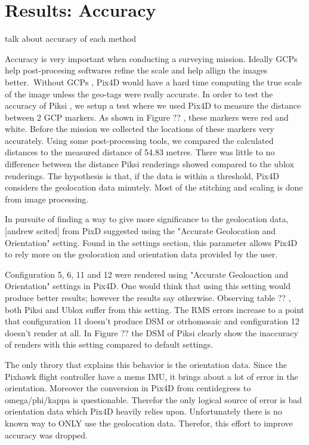 \documentclass{article}
\begin{document}
\section{Results: Accuracy}
talk about accuracy of each method

Accuracy is very important when conducting a surveying mission. Ideally GCPs help post-procesing softwares refine the scale and help allign the images better. Without GCPs , Pix4D would have a hard time computing the true scale of the image unless the geo-tags were really accurate. In order to test the accuracy of Piksi , we setup a test where we used Pix4D to measure the distance between 2 GCP markers. As shown in Figure ?? , these markers were red and white. Before the mission we collected the locations of these markers very accurately. Using some post-processing tools, we compared the calculated distances to the measured distance of 54.83 metres. There was little to no difference between the distance Piksi renderings showed compared to the ublox renderings. The hypothesis is that, if the data is within a threshold, Pix4D considers the geolocation data minutely. Most of the stitching and scaling is done from image processing.

In pursuite of finding a way to give more significance to the geolocation data, [andrew scited] from PixD suggested using the "Accurate Geolocation and Orientation" setting. Found in the settings section, this parameter allows Pix4D to rely more on the geolocation and orientation data provided by the user.

Configuration 5, 6, 11 and 12 were rendered using "Accurate Geoloaction and Orientation" settings in Pix4D. One would think that using this setting would produce better results; however the results say otherwise. Observing table ?? , both Piksi and Ublox suffer from this setting. The RMS errors increase to a point that configuration 11 doesn't produce DSM or otrhomosaic and configuration 12 doesn't render at all. In Figure ?? the DSM of Piksi clearly show the inaccuracy of renders with this setting compared to default settings.

The only throry that explains this behavior is the orientation data. Since the Pixhawk flight controller have a mems IMU, it brings about a lot of error in the orientation. Moreover the conversion in Pix4D from centidegrees to omega/phi/kappa is questionable. Therefor the only logical source of error is bad orientation data which Pix4D heavily relies upon. Unfortunately there is no known way to ONLY use the geolocation data. Therefor, this effort to improve accuracy was dropped.
\end{document}
